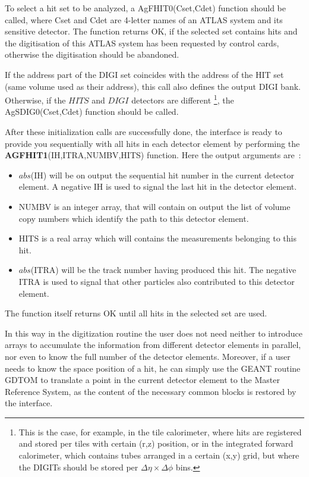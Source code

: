 To select a hit set to be analyzed,
a AgFHIT0(Cset,Cdet) function should be called,
where Cset and Cdet are 4-letter names
of an   ATLAS system and its sensitive detector.
The function returns OK, %
if the  selected set contains hits 
and the digitisation of this ATLAS
system has been requested by  control cards,
otherwise the digitisation should be abandoned.

If the address part of the DIGI set 
coincides  with the address of the HIT set
(same volume used as their address),
this call also defines the output DIGI bank.
Otherwise, if the $HITS$ and $DIGI$ detectors are different
\footnote{ This is the case, for example, in the tile calorimeter, 
   where hits are registered and stored per tiles with certain (r,z) position, 
   or in the integrated forward calorimeter, which contains tubes
   arranged in a certain (x,y) grid, but where the DIGITs should 
   be stored per $\Delta \eta \times \Delta \phi $ bins.},
the AgSDIG0(Cset,Cdet) function should be called.

After these initialization calls are successfully done,
the \as interface is ready to provide you sequentially 
with all hits in each detector element by performing
the {\bf AGFHIT1}(IH,ITRA,NUMBV,HITS) function.
Here the output arguments are~:
\begin{itemize}
\item
$abs$(IH) will be on output the sequential hit number 
in the current detector element. 
A negative IH is used to signal the last hit
in the detector element.
\item
NUMBV is an integer array, that will contain on output the list of volume
copy numbers which identify  the path to this detector element.
\item
HITS is a real array  which will contains
the measurements belonging to this hit.
\item
$abs$(ITRA) will be the track number having produced
this hit. The negative ITRA
is used to signal that other particles also
contributed to this detector element. 
\end{itemize}
The function itself returns OK  until all hits
in the selected set are used.
 
In this way in the digitization routine the user does not need 
neither to introduce arrays to accumulate the information 
from different detector elements in parallel, 
nor even to know the full number of the detector elements.
Moreover, if a user needs to know the space position of a hit,
he can simply use the GEANT routine GDTOM
to translate a point in the current detector element to the
Master Reference System, as the content of the necessary common 
blocks is restored by the \as interface.

